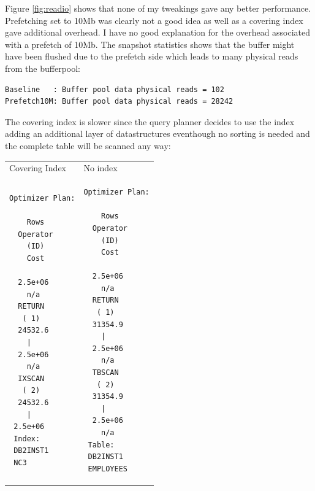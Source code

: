 Figure \ref{fig:readio} shows that none of my tweakings gave any better
performance. Prefetching set to 10Mb was clearly not a good idea as well as a
covering index gave additional overhead. I have no good explanation for the
overhead associated with a prefetch of 10Mb. The snapshot statistics shows that
the buffer might have been flushed due to the prefetch side which leads to many
physical reads from the bufferpool:
\begin{verbatim}
Baseline   : Buffer pool data physical reads = 102
Prefetch10M: Buffer pool data physical reads = 28242
\end{verbatim}
The covering index is slower since the query planner decides to use the index
adding an additional layer of datastructures eventhough no sorting is needed and
the complete table will be scanned any way:\\
\noindent\begin{tabular}{p{5cm}|p{5cm}}
  Covering Index & No index
 \\
\begin{verbatim}
Optimizer Plan:

    Rows   
  Operator 
    (ID)   
    Cost   
          
  2.5e+06 
    n/a   
  RETURN  
   ( 1)   
  24532.6 
    |     
  2.5e+06 
    n/a   
  IXSCAN  
   ( 2)   
  24532.6 
    |     
 2.5e+06  
 Index:   
 DB2INST1 
 NC3      
\end{verbatim}
&
\begin{verbatim}
Optimizer Plan:

    Rows   
  Operator 
    (ID)   
    Cost   
          
  2.5e+06 
    n/a   
  RETURN  
   ( 1)   
  31354.9 
    |     
  2.5e+06 
    n/a   
  TBSCAN  
   ( 2)   
  31354.9 
    |      
  2.5e+06  
    n/a    
 Table:    
 DB2INST1  
 EMPLOYEES 
\end{verbatim}
\\
\hline
\end{tabular}

